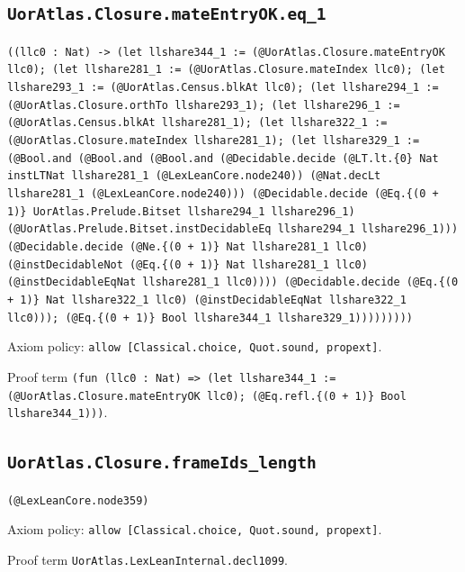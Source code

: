 \documentclass[11pt]{article}
\begin{document}
\subsection*{\texttt{UorAtlas.Closure.mateEntryOK.eq\_1}}
\noindent\texttt{((llc0 : Nat) -> (let llshare344\_1 := (@UorAtlas.Closure.mateEntryOK llc0); (let llshare281\_1 := (@UorAtlas.Closure.mateIndex llc0); (let llshare293\_1 := (@UorAtlas.Census.blkAt llc0); (let llshare294\_1 := (@UorAtlas.Closure.orthTo llshare293\_1); (let llshare296\_1 := (@UorAtlas.Census.blkAt llshare281\_1); (let llshare322\_1 := (@UorAtlas.Closure.mateIndex llshare281\_1); (let llshare329\_1 := (@Bool.and (@Bool.and (@Bool.and (@Decidable.decide (@LT.lt.\{0\} Nat instLTNat llshare281\_1 (@LexLeanCore.node240)) (@Nat.decLt llshare281\_1 (@LexLeanCore.node240))) (@Decidable.decide (@Eq.\{(0 + 1)\} UorAtlas.Prelude.Bitset llshare294\_1 llshare296\_1) (@UorAtlas.Prelude.Bitset.instDecidableEq llshare294\_1 llshare296\_1))) (@Decidable.decide (@Ne.\{(0 + 1)\} Nat llshare281\_1 llc0) (@instDecidableNot (@Eq.\{(0 + 1)\} Nat llshare281\_1 llc0) (@instDecidableEqNat llshare281\_1 llc0)))) (@Decidable.decide (@Eq.\{(0 + 1)\} Nat llshare322\_1 llc0) (@instDecidableEqNat llshare322\_1 llc0))); (@Eq.\{(0 + 1)\} Bool llshare344\_1 llshare329\_1)))))))))}\par
\noindent Axiom policy: \texttt{allow [Classical.choice, Quot.sound, propext]}.\par
\noindent Proof term \texttt{(fun (llc0 : Nat) => (let llshare344\_1 := (@UorAtlas.Closure.mateEntryOK llc0); (@Eq.refl.\{(0 + 1)\} Bool llshare344\_1)))}.\par
\subsection*{\texttt{UorAtlas.Closure.frameIds\_length}}
\noindent\texttt{(@LexLeanCore.node359)}\par
\noindent Axiom policy: \texttt{allow [Classical.choice, Quot.sound, propext]}.\par
\noindent Proof term \texttt{UorAtlas.LexLeanInternal.decl1099}.\par
\end{document}
